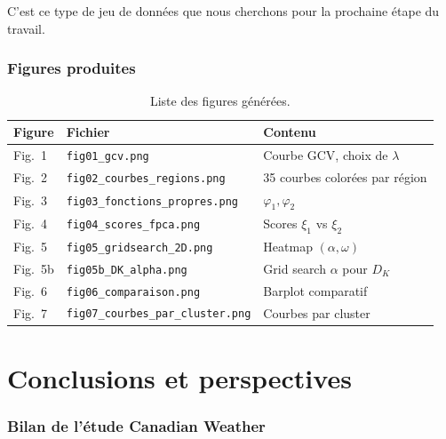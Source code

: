 \documentclass[11pt, a4paper]{article}
\newcommand{\DK}{D_K}
\theoremstyle{definition}
\theoremstyle{remark}
\begin{document}
C'est ce type de jeu de données que nous cherchons pour la prochaine étape du
travail.

\section{Figures produites}

\begin{table}[H]
\centering
\begin{tabular}{lll}
  \toprule
  \textbf{Figure} & \textbf{Fichier} & \textbf{Contenu} \\
  \midrule
  Fig.~1 & \texttt{fig01\_gcv.png}             & Courbe GCV, choix de $\lambda$ \\
  Fig.~2 & \texttt{fig02\_courbes\_regions.png} & 35 courbes colorées par région \\
  Fig.~3 & \texttt{fig03\_fonctions\_propres.png} & $\varphi_1, \varphi_2$ \\
  Fig.~4 & \texttt{fig04\_scores\_fpca.png}     & Scores $\xi_1$ vs $\xi_2$ \\
  Fig.~5 & \texttt{fig05\_gridsearch\_2D.png}   & Heatmap $(\alpha, \omega)$ \\
  Fig.~5b& \texttt{fig05b\_DK\_alpha.png}       & Grid search $\alpha$ pour $\DK$ \\
  Fig.~6 & \texttt{fig06\_comparaison.png}      & Barplot comparatif \\
  Fig.~7 & \texttt{fig07\_courbes\_par\_cluster.png} & Courbes par cluster \\
  \bottomrule
\end{tabular}
\caption{Liste des figures générées.}
\end{table}

\newpage
\part{Conclusions et perspectives}

\section{Bilan de l'étude Canadian Weather}
\end{document}
